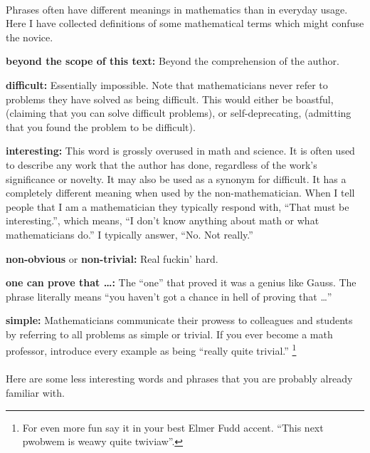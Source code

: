 \paragraph{}
Phrases often have different meanings in mathematics than in everyday usage.
Here I have collected definitions of some mathematical terms which might
confuse the novice.


\begin{description}
\item{\textbf{beyond the scope of this text:}}
  Beyond the comprehension of the author.
\item{\textbf{difficult:}}
  Essentially impossible.  Note that mathematicians never refer to problems 
  they have solved as being difficult.  This would either be boastful, 
  (claiming that you can solve difficult problems), or self-deprecating,
  (admitting that you found the problem to be difficult).
\item{\textbf{interesting:}}
  This word is grossly overused in math and science.
  It is often used to describe any work that the author has done, regardless 
  of the work's significance or novelty.
  It may also be used as a synonym for difficult.
  It has a completely different meaning when used by the non-mathematician.
  When I tell people that I am a mathematician they typically respond 
  with, ``That must be interesting.'', which means, ``I don't know 
  anything about math or what mathematicians do.''  I typically answer,
  ``No.  Not really.''  
\item{\textbf{non-obvious} or \textbf{non-trivial:}}
  Real fuckin' hard.
\item{\textbf{one can prove that \ldots:}}
  The ``one'' that proved it was a genius like Gauss.  The phrase literally 
  means ``you haven't got a chance in hell of proving that \ldots''
\item{\textbf{simple:}}
  Mathematicians communicate their prowess to colleagues and students by 
  referring to all problems as simple or trivial.  If you ever become a math
  professor, introduce every example as being ``really quite trivial.''
  \footnote{For even more fun say it in your best Elmer Fudd accent.
    ``This next pwobwem is weawy quite twiviaw''.}
\end{description}



\paragraph{}
Here are some less interesting words and phrases that you are 
probably already familiar with.

